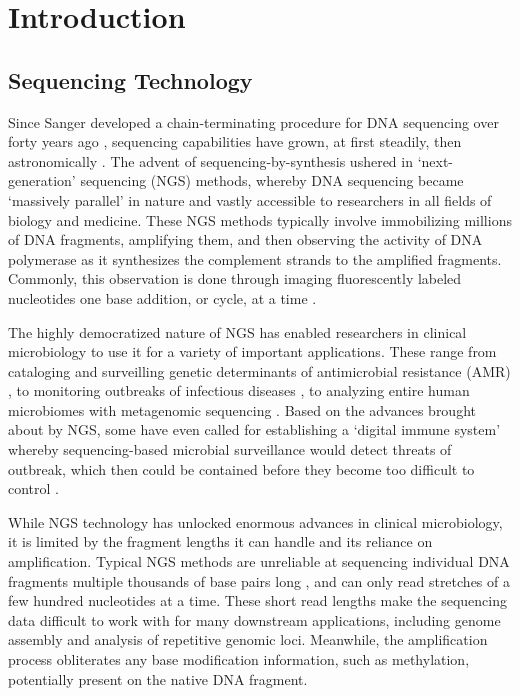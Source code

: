 \chapter{Introduction}
\label{chap:intro}

\section{Sequencing Technology}
\label{sec:seq}
Since Sanger developed a chain-terminating procedure for DNA sequencing over forty years ago \citep{Sanger1977-lo}, sequencing capabilities have grown, at first steadily, then astronomically \citep{Schatz2013-vw}. The advent of sequencing-by-synthesis ushered in ‘next-generation’ sequencing (NGS) methods, whereby DNA sequencing became ‘massively parallel’ in nature and vastly accessible to researchers in all fields of biology and medicine. These NGS methods typically involve immobilizing millions of DNA fragments, amplifying them, and then observing the activity of DNA polymerase as it synthesizes the complement strands to the amplified fragments. Commonly, this observation is done through imaging fluorescently labeled nucleotides one base addition, or cycle, at a time \citep{Shendure2017-oy}.

The highly democratized nature of NGS has enabled researchers in clinical microbiology to use it for a variety of important applications. These range from cataloging and surveilling genetic determinants of antimicrobial resistance (AMR) \citep{Crofts2017-ni, Canica2019-ho, Toth2020-ov, Thanner2016-wy, Hendriksen2019-qi}, to monitoring outbreaks of infectious diseases \citep{Dipaola2020-bw, Lu2020-ti}, to analyzing entire human microbiomes with metagenomic sequencing \citep{Chiu2019-cg}. Based on the advances brought about by NGS, some have even called for establishing a ‘digital immune system’ whereby sequencing-based microbial surveillance would detect threats of outbreak, which then could be contained before they become too difficult to control \citep{Schatz2012-ow}.

While NGS technology has unlocked enormous advances in clinical microbiology, it is limited by the fragment lengths it can handle and its reliance on amplification. Typical NGS methods are unreliable at sequencing individual DNA fragments multiple thousands of base pairs long \citep{Heather2016-wb}, and can only read stretches of a few hundred nucleotides at a time. These short read lengths make the sequencing data difficult to work with for many downstream applications, including genome assembly and analysis of repetitive genomic loci. Meanwhile, the amplification process obliterates any base modification information, such as methylation, potentially present on the native DNA fragment.

